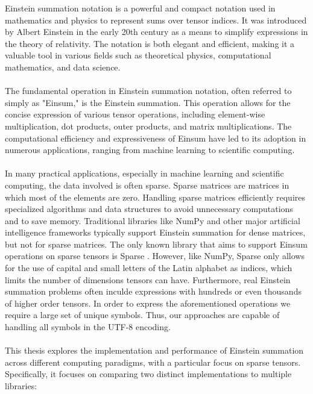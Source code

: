 Einstein summation notation is a powerful and compact notation used in mathematics
and physics to represent sums over tensor indices. It was introduced by Albert
Einstein in the early 20th century as a means to simplify expressions in the
theory of relativity. \cite{einstein1916} The notation is both elegant and efficient,
making it a valuable tool in various fields such as theoretical physics, computational
mathematics, and data science.
\\\\
The fundamental operation in Einstein summation notation, often referred to simply
as "Einsum," is the Einstein summation. This operation allows for the concise expression
of various tensor operations, including element-wise multiplication, dot products,
outer products, and matrix multiplications. The computational efficiency and
expressiveness of Einsum have led to its adoption in numerous applications,
ranging from machine learning to scientific computing.
\\\\
In many practical applications, especially in machine learning and scientific computing,
the data involved is often sparse. Sparse matrices are matrices in which most of
the elements are zero. Handling sparse matrices efficiently requires specialized
algorithms and data structures to avoid unnecessary computations and to save memory.
Traditional libraries like NumPy \cite{numpy} and other major artificial intelligence
frameworks \cite{tensorflow, pytorch} typically support Einstein summation
for dense matrices, but not for sparse matrices. The only known library that aims to
support Einsum operations on sparse tensors is Sparse \cite{sparse}. However, like NumPy,
Sparse only allows for the use of capital and small letters of the Latin alphabet as
indices, which limits the number of dimensions tensors can have. Furthermore,
real Einstein summation problems often inculde expressions with hundreds or even thousands
of higher order tensors. In order to express the aforementioned operations we require a
large set of unique symbols. Thus, our approaches are capable of handling all
symbols in the UTF-8 encoding.
\\\\
This thesis explores the implementation and performance of Einstein summation
across different computing paradigms, with a particular focus on sparse tensors.
Specifically, it focuses on comparing two distinct implementations to multiple libraries:
%
